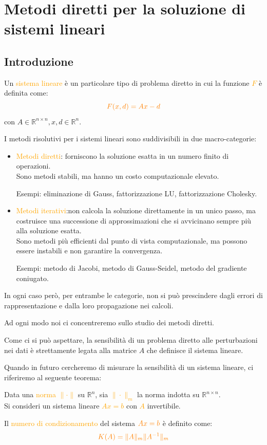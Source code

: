 \chapter{Metodi diretti per la soluzione di sistemi lineari}

\section{Introduzione}
Un \textcolor{orange}{sistema lineare} è un particolare tipo di problema diretto in cui la funzione \textcolor{orange}{$F$}
è definita come:
\[\textcolor{orange}{F(x, d) = Ax - d}\]
con $A \in \mathbb{R}^{n \times n}, x, d \in \mathbb{R}^n$.

I metodi risolutivi per i sistemi lineari sono suddivisibili
in due macro-categorie:
\begin{itemize}
\item \textcolor{orange}{Metodi diretti}: forniscono la soluzione esatta in un numero finito di operazioni.\\
Sono metodi stabili, ma hanno un costo computazionale elevato.

Esempi: eliminazione di Gauss, fattorizzazione LU, fattorizzazione Cholesky.
\item \textcolor{orange}{Metodi iterativi}:non calcola la soluzione direttamente in un unico passo, ma 
costruisce una successione di approssimazioni che si avvicinano sempre più alla soluzione esatta.\\
Sono metodi più efficienti dal punto di vista computazionale, ma possono essere instabili e non garantire la convergenza.

Esempi: metodo di Jacobi, metodo di Gauss-Seidel, metodo del gradiente coniugato.
\end{itemize}

In ogni caso però, per entrambe le categorie, non si può prescindere dagli
errori di rappresentazione e dalla loro propagazione nei calcoli.

Ad ogni modo noi ci concentreremo sullo studio dei metodi diretti.

Come ci si può aspettare, la sensibilità di un problema diretto alle perturbazioni nei dati è strettamente legata alla matrice 
$A$ che definisce il sistema lineare.

Quando in futuro cercheremo di misurare la sensibilità di un sistema lineare, ci riferiremo al seguente teorema:
\begin{theorem}
    Data una \textcolor{orange}{norma  $\|\cdot\|$} su $\mathbb{R}^n$, sia \textcolor{orange}{$\|\cdot\|_m$} 
    la norma indotta su $\mathbb{R}^{n \times n}$.\\
    Si consideri un sistema lineare \textcolor{orange}{$Ax = b$} con \textcolor{orange}{$A$} invertibile.

    Il \textcolor{orange}{numero di condizionamento} del
    sistema $\textcolor{orange}{Ax = b}$ è definito come:
    \[\textcolor{orange}{K(A) = \|A\|_m \|A^{-1}\|_m}\]
\end{theorem}

